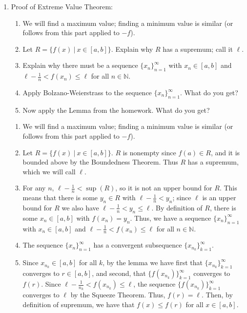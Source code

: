 \documentclass[12pt]{amsart}
\newcommand{\N}{\mathbb{N}}
\numberwithin{equation}{section}
\theoremstyle{plain} %
\theoremstyle{definition}
\theoremstyle{remark}
\begin{document}
\begin{enumerate}
\item Proof of Extreme Value Theorem:
\begin{enumerate}
\item[\null] We will find a maximum value; finding a minimum value is similar (or follows from this part applied to $-f$).
\item Let $R = \{ f(x) \ |\  x\in [a,b]\}$. Explain why $R$ has a supremum; call it $\ell$.
\item Explain why there must be a sequence $\{x_n\}_{n=1}^\infty$ with $x_n\in[a,b]$ and $\ell- \frac{1}{n} <f(x_n)\leq \ell$ for all $n\in \N$.
\item Apply Bolzano-Weierstrass to the sequence $\{x_n\}_{n=1}^\infty$. What do you get?
\item Now apply the Lemma from the homework. What do you get?
\end{enumerate}

\begin{framed}
\begin{enumerate}
\item[\null] We will find a maximum value; finding a minimum value is similar (or follows from this part applied to $-f$).
\item Let $R = \{ f(x) \ |\  x\in [a,b]\}$. $R$ is nonempty since $f(a)\in R$, and it is bounded above by the Boundedness Theorem. Thus $R$ has a supremum, which we will call $\ell$.
\item For any $n$, $\ell-\frac{1}{n} < \sup(R)$, so it is not an upper bound for $R$. This means that there is some $y_n\in R$ with $\ell-\frac{1}{n} < y_n$; since $\ell$ is an upper bound for $R$ we also have $\ell-\frac{1}{n} < y_n\leq \ell$. By definition of $R$, there is some $x_n\in [a,b]$ with $f(x_n) = y_n$. Thus, we have a sequence $\{x_n\}_{n=1}^\infty$ with $x_n\in[a,b]$ and $\ell- \frac{1}{n} <f(x_n)\leq \ell$ for all $n\in \N$.
\item The sequence $\{x_n\}_{n=1}^\infty$ has a convergent subsequence $\{x_{n_k}\}_{k=1}^\infty$.
\item Since $x_{n_k}\in[a,b]$ for all $k$, by the lemma we have first that $\{x_{n_k}\}_{k=1}^\infty$ converges to $r\in [a,b]$, and second, that $\{f(x_{n_k})\}_{k=1}^\infty$ converges to $f(r)$. Since $ \ell - \frac{1}{n_k} < f(x_{n_k})\leq \ell $, the sequence $\{f(x_{n_k})\}_{k=1}^\infty$ converges to $\ell$ by the Squeeze Theorem. Thus, $f(r) = \ell$. Then, by definition of supremum, we have that $f(x)\leq f(r)$ for all $x\in[a,b]$.
\end{enumerate}
\end{framed}
\end{enumerate}
\end{document}

